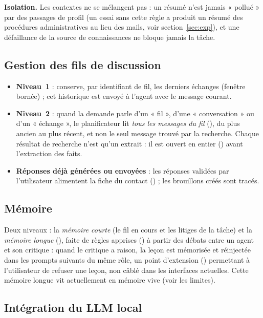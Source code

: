 \textbf{Isolation.} Les contextes ne se mélangent pas : un résumé n'est jamais « pollué » par des passages de profil (un essai sans cette règle a produit un résumé des procédures administratives au lieu des mails, voir section~\ref{sec:exp}), et une défaillance de la source de connaissances ne bloque jamais la tâche.

\subsection{Gestion des fils de discussion}

\begin{itemize}
  \item \textbf{Niveau~1} :  conserve, par identifiant de fil, les derniers échanges (fenêtre bornée) ; cet historique est envoyé à l'agent avec le message courant.
  \item \textbf{Niveau~2} : quand la demande parle d'un « fil », d'une « conversation » ou d'un « échange », le planificateur lit \emph{tous les messages du fil} (), du plus ancien au plus récent, et non le seul message trouvé par la recherche. Chaque résultat de recherche n'est qu'un extrait : il est ouvert en entier () avant l'extraction des faits.
  \item \textbf{Réponses déjà générées ou envoyées} : les réponses validées par l'utilisateur alimentent la fiche du contact () ; les brouillons créés sont tracés.
\end{itemize}

\subsection{Mémoire}

Deux niveaux : la \emph{mémoire courte} (le fil en cours et les litiges de la tâche) et la \emph{mémoire longue} (), faite de règles apprises () à partir des débats entre un agent et son critique : quand le critique a raison, la leçon est mémorisée et réinjectée dans les prompts suivants du même rôle, un point d'extension () permettant à l'utilisateur de refuser une leçon, non câblé dans les interfaces actuelles. Cette mémoire longue vit actuellement en mémoire vive (voir les limites).

\subsection{Intégration du LLM local}

